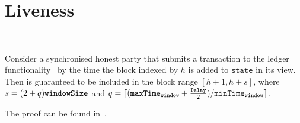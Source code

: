 \section{Liveness} \ \\
\label{sec:liveness}

\begin{proposition}
  \label{prop:liveness}
  Consider a synchronised honest party that submits a transaction \tx to the
  ledger functionality~\cite{genesis} by the time the block indexed by $h$ is
  added to $\texttt{state}$ in its view. Then \tx is guaranteed to be included
  in the block range $[h+1, h + s]$, where $s = (2 + q) \texttt{windowSize}$ and $q = \lceil
  (\texttt{maxTime}_\texttt{window} + \frac{\texttt{Delay}}{2})/ \texttt{minTime}_\texttt{window} \rceil$.
\end{proposition}

The proof can be found in~\cite{DBLP:conf/csfw/KiayiasL20}.
